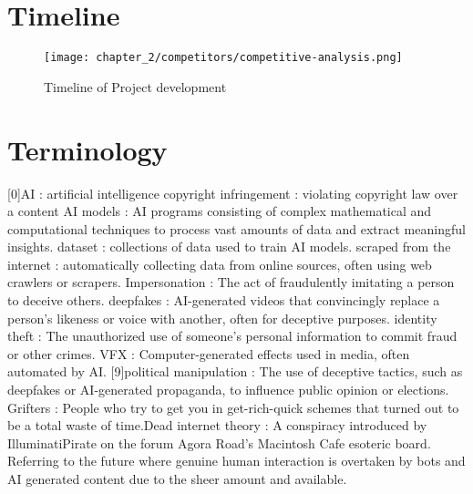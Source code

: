 \section{Timeline}
\label{section:timeline}
\begin{figure}[h]
    \centering
    \texttt{[image: chapter\_2/competitors/competitive-analysis.png]}
    \caption{Timeline of Project development}

\end{figure}

\section{Terminology}
\label{section:terminology}

[0]AI : artificial intelligence \newline
[1]copyright infringement : violating copyright law over a content \newline 
[2]AI models : AI programs consisting of complex mathematical and computational techniques to process vast amounts of data and extract meaningful insights. \newline
[3]dataset : collections of data used to train AI models. \newline
[4]scraped from the internet : automatically collecting data from online sources, often using web crawlers or scrapers. \newline
[5]Impersonation : The act of fraudulently imitating a person to deceive others. \newline
[6]deepfakes : AI-generated videos that convincingly replace a person’s likeness or voice with another, often for deceptive purposes. \newline
[7]identity theft : The unauthorized use of someone’s personal information to commit fraud or other crimes. \newline
[8]VFX : Computer-generated effects used in media, often automated by AI.
[9]political manipulation : The use of deceptive tactics, such as deepfakes or AI-generated propaganda, to influence public opinion or elections. \newline
[10]Grifters : People who try to get you in get-rich-quick schemes that turned out to be a total waste of time.\newline
[11]Dead internet theory : A conspiracy introduced by IlluminatiPirate on the forum Agora Road's Macintosh Cafe esoteric board. Referring to the future where genuine human interaction is overtaken by bots and AI generated content due to the sheer amount and available.\newline
